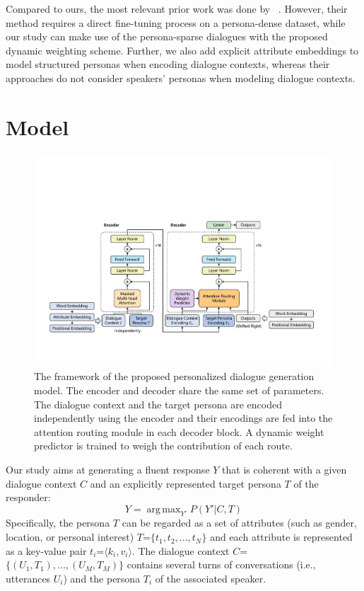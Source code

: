 \documentclass[letterpaper]{article} %
\newcommand{\citet}[1]{\citeauthor{#1} \shortcite{#1}}
\DeclareMathOperator*{\argmax}{arg\,max}
\begin{document}
Compared to ours, the most relevant prior work was done by~\citet{golovanov-etal-2019-large}. However, their method requires a direct fine-tuning process on a persona-dense dataset, while our study can make use of the persona-sparse dialogues with the proposed dynamic weighting scheme. Further, we also add explicit attribute embeddings to model structured personas when encoding dialogue contexts, whereas their approaches do not consider speakers' personas when modeling dialogue contexts.

\section{Model}
\begin{figure}[t]
    \centering
    \includegraphics[width=430px]{figures/fig_model.pdf}
    \caption{The framework of the proposed personalized dialogue generation model. The encoder and decoder share the same set of parameters. The dialogue context and the target persona are encoded independently using the encoder and their encodings are fed into the attention routing module in each decoder block. A dynamic weight predictor is trained to weigh the contribution of each route.}
    \label{fig:model_arch}
\end{figure}

Our study aims at generating a fluent response $Y$ that is coherent with a given dialogue context $C$ and an explicitly represented target persona $T$ of the responder:
\begin{equation}
    Y = \argmax_{Y'} P({Y'}|C, T)
\end{equation}
Specifically, the persona $T$ can be regarded as a set of attributes (such as gender, location, or personal interest) $T$=$\{t_1, t_2, ..., t_N\}$ and each attribute is represented as a key-value pair $t_i$=$\langle k_i, v_i\rangle$. The dialogue context $C$=$\{(U_1, T_1), ..., (U_M, T_M)\}$ contains several turns of conversations (i.e., utterances $U_i$) and the persona $T_i$ of the associated speaker.
\end{document}
